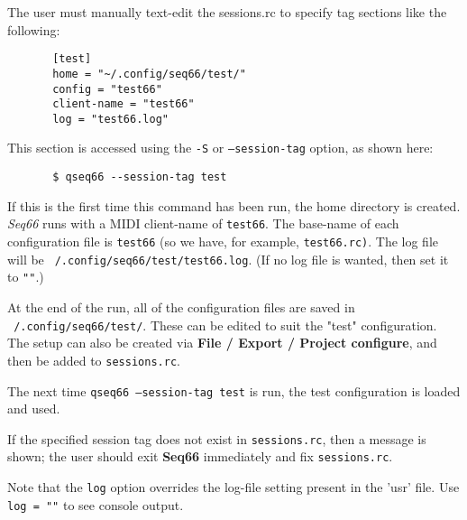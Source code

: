    The user must manually text-edit the sessions.rc to specify tag
   sections like the following:

   \begin{verbatim}
       [test]
       home = "~/.config/seq66/test/"
       config = "test66"
       client-name = "test66"
       log = "test66.log"
   \end{verbatim}

   This section is accessed using the \texttt{-S} or
   \texttt{--session-tag} option, as shown here:

   \begin{verbatim}
       $ qseq66 --session-tag test
   \end{verbatim}

   If this is the first time this command has been run, the
   home directory is created.
   \textsl{Seq66} runs with a MIDI client-name of
   \texttt{test66}.
   The base-name of each configuration file
   is \texttt{test66} (so we have, for example, \texttt{test66.rc)}.
   The log file will be
   \texttt{~/.config/seq66/test/test66.log}.
   (If no log file is wanted, then set it to \texttt{""}.)

   At the end of the run, all of the configuration files are
   saved in 
   \texttt{~/.config/seq66/test/}.
   These can be edited to suit the "test" configuration.
   The setup can also be created via
   \textbf{File / Export / Project configure},
   and then be added to \texttt{sessions.rc}.

   The next time 
   \texttt{qseq66 --session-tag test}
   is run, the test configuration is loaded and used.

   If the specified session tag does not exist in \texttt{sessions.rc},
   then a message is shown; the user should exit \textbf{Seq66} immediately
   and fix \texttt{sessions.rc}.

   Note that the \texttt{log} option overrides the log-file setting
   present in the 'usr' file. Use \texttt{log = ""} to see console output.

